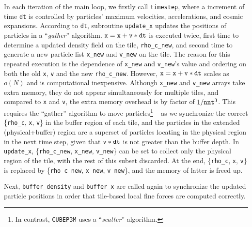\documentclass[10pt,twocolumn,preprint]{emulateapj}
\begin{document}
In each iteration of the main loop, we firstly call {\tt timestep}, where a increment of time {\tt dt} is controlled by particles' maximum velocities, accelerations, and cosmic expansions. According to {\tt dt}, subroutine {\tt update\_x} updates the positions of particles in a ``{\it gather}'' algorithm. ${\tt x}={\tt x}+{\tt v}*{\tt dt}$ is executed twice, first time to determine a updated density field on the tile, {\tt rho\_c\_new}, and second time to generate a new particle list {\tt x\_new} and {\tt v\_new} on the tile. The reason for this repeated execution is the dependence of {\tt x\_new} and {\tt v\_new}'s value and ordering on both the old {\tt x}, {\tt v} and the new {\tt rho\_c\_new}. However, ${\tt x}={\tt x}+{\tt v}*{\tt dt}$ scales as $o(N)$ and is computational inexpensive. Although {\tt x\_new} and {\tt v\_new} arrays take extra memory, they do not appear simultaneously for multiple tiles, and compared to {\tt x} and {\tt v}, the extra memory overhead is by factor of $1/{\tt nnt}^3$. This requires the ``gather'' algorithm to move particles\footnote{In contrast, {\tt CUBEP3M} uses a ``{\it scatter}'' algorithm.} -- as we synchronize the correct \{{\tt rho\_c}, {\tt x}, {\tt v}\} in the buffer region of each tile, and the particles in the extended (physical+buffer) region are a superset of particles locating in the physical region in the next time step, given that ${\tt v}*{\tt dt}$ is not greater than the buffer depth. In {\tt update\_x}, \{{\tt rho\_c\_new}, {\tt x\_new}, {\tt v\_new}\} can be set to collect only the physical region of the tile, with the rest of this subset discarded. At the end, \{{\tt rho\_c}, {\tt x}, {\tt v}\} is replaced by \{{\tt rho\_c\_new}, {\tt x\_new}, {\tt v\_new}\}, and the memory of latter is freed up.

Next, {\tt buffer\_density} and {\tt buffer\_x} are called again to synchronize the updated particle positions in order that tile-based local fine forces are computed correctly.
\end{document}
